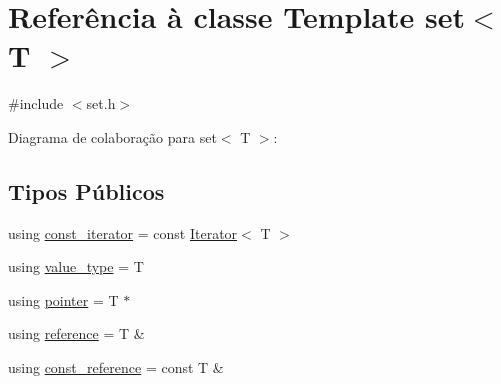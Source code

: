 \hypertarget{classset}{}\section{Referência à classe Template set$<$ T $>$}
\label{classset}


{\ttfamily \#include $<$set.\+h$>$}



Diagrama de colaboração para set$<$ T $>$\+:
\subsection*{Tipos Públicos}
\begin{DoxyCompactItemize}
\item 
using \hyperlink{classset_a1a9f610c8f0dd1d2ca1af0f435e45067}{const\+\_\+iterator} = const \hyperlink{classIterator}{Iterator}$<$ T $>$
\item 
using \hyperlink{classset_a9401e4f521bf0b6833a37ee4ab9fa67c}{value\+\_\+type} = T
\item 
using \hyperlink{classset_ad32f9470f9e3b712862cef35b28ac0a3}{pointer} = T $\ast$
\item 
using \hyperlink{classset_a67b599d0cfab79343858fd88906b7f27}{reference} = T \&
\item 
using \hyperlink{classset_aaafc18d8ba5261e496a013e32b9dbe28}{const\+\_\+reference} = const T \&
\end{DoxyCompactItemize}
